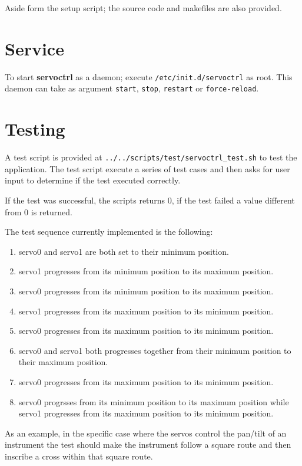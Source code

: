 Aside form the setup script; the source code and makefiles are also provided.

\section{Service}
To start \textbf{servoctrl} as a daemon; execute \texttt{/etc/init.d/servoctrl}
as root. This daemon can take as argument \texttt{start}, \texttt{stop},
\texttt{restart} or \texttt{force-reload}.

\section{Testing}
A test script is provided at \texttt{../../scripts/test/servoctrl\_test.sh} to
test the application. The test script execute a series of test cases and then
asks for user input to determine if the test executed correctly.

If the test was successful, the scripts returns 0, if the test failed a value
different from 0 is returned.

The test sequence currently implemented is the following:

   \begin{enumerate}
      \item servo0 and servo1 are both set to their minimum position.
      \item servo1 progresses from its minimum position to its maximum position.
      \item servo0 progresses from its minimum position to its maximum position.
      \item servo1 progresses from its maximum position to its minimum position.
      \item servo0 progresses from its maximum position to its minimum position.
      \item servo0 and servo1 both progresses together from their minimum
         position to their maximum position.
      \item servo0 progresses from its maximum position to its minimum position.
      \item servo0 progrsses from its minimum position to its maximum position
         while servo1 progresses from its maximum position to its minimum
         position.
   \end{enumerate}

As an example, in the specific case where the servos control the pan/tilt of an
instrument the test should make the instrument follow a square route and then
inscribe a cross within that square route.
